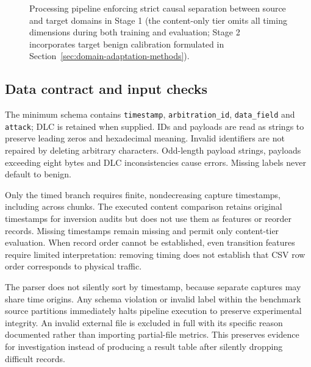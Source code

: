 \documentclass[12pt, a4paper, reqno, oneside]{book}
\DeclareRobustCommand{\code}[1]{\nolinkurl{#1}}
\begin{document}
\begin{figure}[htbp]\centering
{}
\caption[Processing pipeline and strict source--target causal boundary]{Processing pipeline enforcing strict causal separation between source and target domains in Stage 1 (the content-only tier omits all timing dimensions during both training and evaluation; Stage 2 incorporates target benign calibration formulated in Section~\ref{sec:domain-adaptation-methods}).}\label{fig:pipeline}
\end{figure}

\subsection{Data contract and input checks}
The minimum schema contains \code{timestamp}, \code{arbitration_id}, \code{data_field} and \code{attack}; DLC is retained when supplied. IDs and payloads are read as strings to preserve leading zeros and hexadecimal meaning. Invalid identifiers are not repaired by deleting arbitrary characters. Odd-length payload strings, payloads exceeding eight bytes and DLC inconsistencies cause errors. Missing labels never default to benign.

Only the timed branch requires finite, nondecreasing capture timestamps, including across chunks. The executed content comparison retains original timestamps for inversion audits but does not use them as features or reorder records. Missing timestamps remain missing and permit only content-tier evaluation. When record order cannot be established, even transition features require limited interpretation: removing timing does not establish that CSV row order corresponds to physical traffic.

The parser does not silently sort by timestamp, because separate captures may share time origins. Any schema violation or invalid label within the benchmark source partitions immediately halts pipeline execution to preserve experimental integrity. An invalid external file is excluded in full with its specific reason documented rather than importing partial-file metrics. This preserves evidence for investigation instead of producing a result table after silently dropping difficult records.
\end{document}

